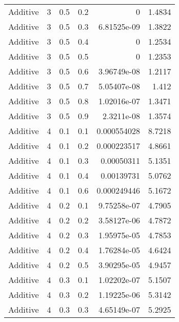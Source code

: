 \documentclass{article}
\begin{document}
\begin{longtable}[H]{lrrrrr}
 Additive       &       3 &   0.5 &            0.2 &   0           &          1.4834 \\
 Additive       &       3 &   0.5 &            0.3 &   6.81525e-09 &          1.3822 \\
 Additive       &       3 &   0.5 &            0.4 &   0           &          1.2534 \\
 Additive       &       3 &   0.5 &            0.5 &   0           &          1.2353 \\
 Additive       &       3 &   0.5 &            0.6 &   3.96749e-08 &          1.2117 \\
 Additive       &       3 &   0.5 &            0.7 &   5.05407e-08 &          1.412  \\
 Additive       &       3 &   0.5 &            0.8 &   1.02016e-07 &          1.3471 \\
 Additive       &       3 &   0.5 &            0.9 &   2.3211e-08  &          1.3574 \\
 Additive       &       4 &   0.1 &            0.1 &   0.000554028 &          8.7218 \\
 Additive       &       4 &   0.1 &            0.2 &   0.000223517 &          4.8661 \\
 Additive       &       4 &   0.1 &            0.3 &   0.00050311  &          5.1351 \\
 Additive       &       4 &   0.1 &            0.4 &   0.00139731  &          5.0762 \\
 Additive       &       4 &   0.1 &            0.6 &   0.000249446 &          5.1672 \\
 Additive       &       4 &   0.2 &            0.1 &   9.75258e-07 &          4.7905 \\
 Additive       &       4 &   0.2 &            0.2 &   3.58127e-06 &          4.7872 \\
 Additive       &       4 &   0.2 &            0.3 &   1.95975e-05 &          4.7853 \\
 Additive       &       4 &   0.2 &            0.4 &   1.76284e-05 &          4.6424 \\
 Additive       &       4 &   0.2 &            0.5 &   3.90295e-05 &          4.9457 \\
 Additive       &       4 &   0.3 &            0.1 &   1.02202e-07 &          5.1507 \\
 Additive       &       4 &   0.3 &            0.2 &   1.19225e-06 &          5.3142 \\
 Additive       &       4 &   0.3 &            0.3 &   4.65149e-07 &          5.2925 \\

\end{longtable}
\end{document}
